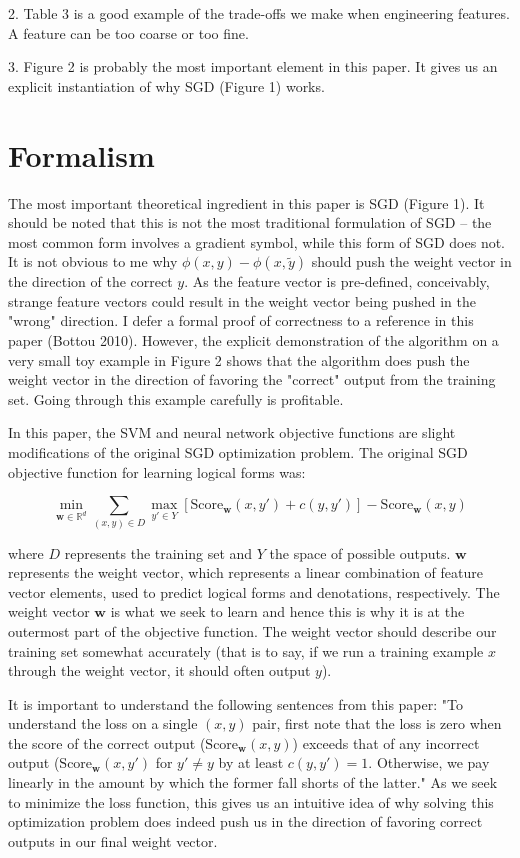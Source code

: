 \documentclass[twoside]{article}
\theoremstyle{definition}
\theoremstyle{definition}
\theoremstyle{remark}
\def\R{{\mathbb R}}
\begin{document}
2. Table 3 is a good example of the trade-offs we make when engineering features. A feature
can be too coarse or too fine.

3. Figure 2 is probably the most important element in this paper. It gives us an explicit
instantiation of why SGD (Figure 1) works.


\section{Formalism}

The most important theoretical ingredient in this paper is SGD (Figure 1). It should be noted
that this is not the most traditional formulation of SGD -- the most common form 
involves a gradient symbol, while this form of SGD does not. It is not 
obvious to me why $\phi(x,y) - \phi(x,\tilde{y})$ should push the weight vector
in the direction of the correct $y$. As the feature vector is pre-defined, conceivably,
strange feature vectors could result in the weight vector being pushed in the "wrong" direction. 
I defer a formal proof of correctness to a reference in this paper (Bottou 2010). However, the explicit demonstration of the algorithm on a very small toy example
in Figure 2 shows that the algorithm does push the weight vector in the direction
of favoring the "correct" output from the training set. Going through this 
example carefully is profitable. 

In this paper, the SVM and neural network
objective functions are slight modifications of the original SGD optimization problem.
The original SGD objective function for learning logical forms was:

\[
  \min_{\textbf{w} \in \R^d} \sum_{(x,y) \in D} \max_{y' \in Y}[\textrm{Score}_{\textbf{w}}(x,y') + c(y,y')] - \textrm{Score}_{\textbf{w}}(x,y)
\]

where $D$ represents the training set and $Y$ the space of possible outputs. $\textbf{w}$
represents the weight vector, which represents a linear combination of feature
vector elements, used to predict logical forms and denotations, respectively. The weight
vector $\textbf{w}$ is what we seek to learn and hence this is why it is at the
outermost part of the objective function. The weight vector should describe our
training set somewhat accurately (that is to say, if we run a training example $x$ through
the weight vector, it should often output $y$).

It is important to understand the following sentences from this paper: "To understand the
loss on a single $(x,y)$ pair, first note that the loss is zero when the score of the
correct output ($\textrm{Score}_{\textbf{w}}(x,y)$) exceeds that of any incorrect output 
($\textrm{Score}_{\textbf{w}}(x,y')$ for $y' \neq y$ by at least $c(y,y') = 1$. Otherwise,
we pay linearly in the amount by which the former fall shorts of the latter." As we seek
to minimize the loss function, this gives us an intuitive idea of why solving this
optimization problem does indeed push us in the direction of favoring correct outputs
in our final weight vector.
\end{document}
